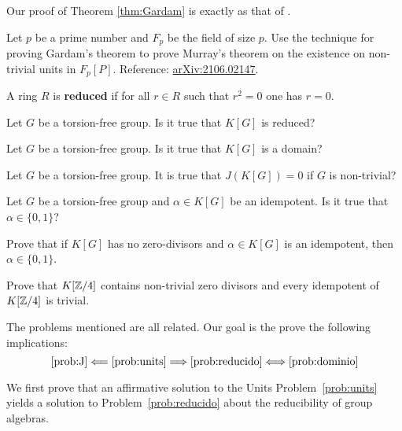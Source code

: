 Our proof of Theorem \ref{thm:Gardam} is exactly 
as that of \cite{MR4334981}. 

\begin{exercise}
     Let $p$ be a prime number and $F_p$ be the field of size $p$. 
     Use the technique 
     for proving Gardam's theorem to prove Murray's theorem
     on the existence 
     on non-trivial units in $F_p[P]$. Reference: \href{https://arxiv.org/abs/2106.02147}{arXiv:2106.02147}. 
\end{exercise}

A ring $R$ is \textbf{reduced} if for all $r\in R$ such that 
$r^2=0$ one has $r=0$. 

\begin{problem}
	\label{prob:reducido}
	Let $G$ be a torsion-free group. Is it true that 
	$K[G]$ is reduced? 
\end{problem}

\begin{problem}
	\label{prob:dominio}
	Let $G$ be a torsion-free group. Is it true that 
	$K[G]$ is a domain?
\end{problem}

\begin{problem}[Semisimplicity]
	\label{prob:J}
	Let $G$ be a torsion-free group. It is true that 
	$J(K[G])=0$ if $G$ is non-trivial?
\end{problem}

\begin{problem}[Idempotents]
	\label{pro:idempotente}
	Let $G$ be a torsion-free group and $\alpha\in K[G]$ be an idempotent. 
	Is it true that $\alpha\in\{0,1\}$?
\end{problem}

\begin{exercise}
	Prove that if $K[G]$ has no zero-divisors and $\alpha\in K[G]$ is an
	idempotent, then $\alpha\in\{0,1\}$.
\end{exercise}

\begin{exercise}
	Prove that $K[\mathbb{Z}/4]$ contains non-trivial zero divisors and every
	idempotent of $K[\mathbb{Z}/4]$ is trivial. 
\end{exercise}

The problems mentioned are all related. Our goal is the prove
the following implications:
\[
	\ref{prob:J}\Longleftarrow\ref{prob:units}\Longrightarrow\ref{prob:reducido}\Longleftrightarrow\ref{prob:dominio}
\]

We first prove that an affirmative solution to the Units
Problem~\ref{prob:units} yields a solution to Problem~\ref{prob:reducido}
about the reducibility of group algebras.

